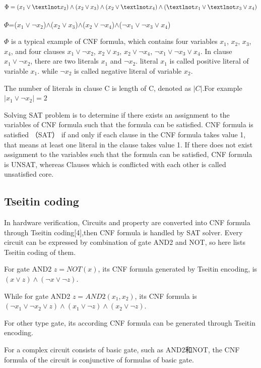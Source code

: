 \documentclass[runningheads,a4paper]{llncs}
\begin{document}
\begin{equation}
\centering \Phi=(x_1\vee¬x_2)\wedge(x_2\vee x_3)\wedge(x_2\vee¬x_4)\wedge(¬x_1\vee¬x_3\vee x_4)
\end{equation}

$\Phi$=($x_1\vee¬x_2$)$\wedge$($x_2\vee x_3$)$\wedge$($x_2\vee¬x_4$)$\wedge$($¬x_1\vee¬x_3\vee x_4$)

$\Phi$ is a typical example of CNF formula, which contains four variables $x_1$, $x_2$, $x_3$, $x_4$, 
and four clauses $x_1\vee¬x_2$, $x_2\vee x_3$, $x_2\vee¬x_4$, $¬x_1\vee¬x_3\vee x_4$.
In clause $x_1\vee¬x_2$, there are two literals $x_1$ and $¬x_2$.
literal $x_1$ is called positive literal of variable $x_1$.
while $¬x_2$ is called negative literal of variable $x_2$.

The number of literals in clause C is length of C, denoted as $|C|$.For example $| x_1\vee ¬x_2 | =2$

Solving SAT problem is to determine if there exists an assignment to the variables of CNF formula such that the formula can be satisfied. 
CNF formula is satisfied （SAT） if and only if each clause in the CNF formula takes value 1, that means at least one literal in the clause takes value 1.
If there does not exist assignment to the variables such that the formula can be satisfied, CNF formula is UNSAT, whereas Clauses which is conflicted with each other is called unsatisfied core.
\subsection{Tseitin coding}

In hardware verification, Circuits and property are converted into CNF formula through Tseitin coding[4],then CNF formula is handled by SAT solver. 
Every circuit can be expressed by combination of gate AND2 and NOT, so here lists Tseitin coding of them. 

For gate AND2  $z=NOT(x)$, its CNF formula generated by Tseitin encoding, is  $(x\vee z)\wedge(¬x\vee¬z)$.

While for gate AND2 $z=AND2(x_1,x_2)$, its CNF formula is $(¬x_1∨¬x_2∨z)\wedge(x_1∨¬z) \wedge(x_2∨¬z)$.

For other type gate, its according CNF formula can be generated through Tseitin encoding.

For a complex circuit consists of basic gate, such as AND2和NOT, the CNF formula of the circuit is conjunctive of formulas of basic gate.
\end{document}
